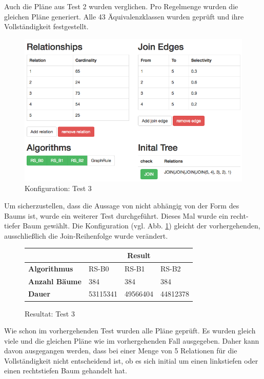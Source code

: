 Auch die Pläne aus Test 2 wurden verglichen. Pro Regelmenge wurden die gleichen Pläne generiert. Alle 43 Äquivalenzklassen wurden geprüft und ihre Vollständigkeit festgestellt.

\begin{figure}[ht]
  \centering
  \includegraphics[width=\textwidth]{05_ResultsEvaluation/00_media/Test3.png}
  \caption{Konfiguration: Test 3}
  \label{Konfiguration:Test3}
\end{figure}


Um sicherzustellen, dass die Aussage von \cite{shanbhag2014optimizing} nicht abhängig von der Form des Baums ist, wurde ein weiterer Test durchgeführt. Dieses Mal wurde ein recht-tiefer Baum gewählt. Die Konfiguration (vgl. Abb. \ref{Konfiguration:Test3}) gleicht der vorhergehenden, ausschließlich die Join-Reihenfolge wurde verändert.

\begin{figure}[ht]
\centering
\begin{tabular}{|l|l|l|l|}
\hline
                         & \multicolumn{3}{c|}{{\bf Result}} \\ \hline
{\bf Algorithmus}        & RS-B0     & RS-B1     & RS-B2     \\ \hline
{\bf Anzahl Bäume}       & 384       & 384       & 384       \\ \hline
{\bf Dauer}              & 53115341  & 49566404  & 44812378  \\ \hline
\end{tabular}

\caption{Resultat: Test 3}
\label{Result:Test3}
\end{figure}


Wie schon im vorhergehenden Test wurden alle Pläne geprüft. Es wurden gleich viele und die gleichen Pläne wie im vorhergehenden Fall ausgegeben. Daher kann davon ausgegangen werden, dass bei einer Menge von 5 Relationen für die Vollständigkeit nicht entscheidend ist, ob es sich initial um einen linkstiefen oder einen rechtstiefen Baum gehandelt hat.




